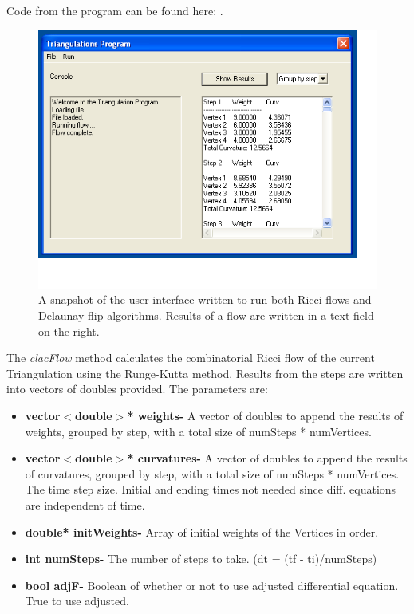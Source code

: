 \documentclass[12pt]{article}
\begin{document}
\noindent Code from the program can be found here: .\newline

\begin{figure}
\begin{center}
\includegraphics[scale = 0.65]{Pictures/GUIpic.png}
\caption{A snapshot of the user interface written to run both Ricci flows and Delaunay flip algorithms. Results of a flow are written in a text field on the right.}
\end{center}
\end{figure}

\noindent The \textit{clacFlow} method calculates the combinatorial Ricci flow of the current Triangulation using the Runge-Kutta method. Results from the steps are written into vectors of doubles provided. The parameters are:\newline

\begin{itemize}
\item\textbf{vector$<$double$>$* weights-} A vector of doubles to append the results of weights, grouped by step, with a total size of numSteps * numVertices.
\item\textbf{vector$<$double$>$* curvatures-} A vector of doubles to append the results of curvatures, grouped by step, with a total size of numSteps * numVertices. The time step size. Initial and ending times not needed since diff. equations are independent of time.
\item\textbf{double* initWeights-} Array of initial weights of the Vertices in order.
\item\textbf{int numSteps-} The number of steps to take. (dt = (tf - ti)/numSteps)
\item\textbf{bool adjF-} Boolean of whether or not to use adjusted differential equation. True to use adjusted.
\end{itemize}
\end{document}
